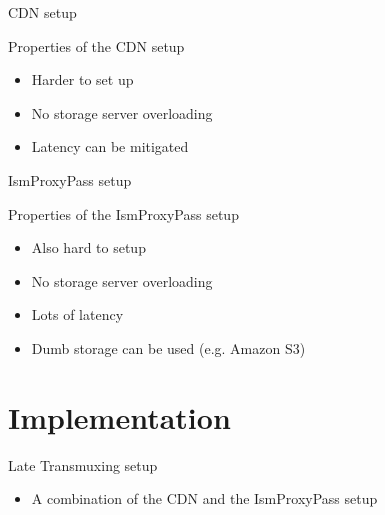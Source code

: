 \documentclass[xcolor=svgnames,handout]{beamer}
\begin{document}
\begin{frame}{CDN setup}
    \begin{figure}

        \resizebox{\textwidth}{!}{%
            
        }
    \end{figure}
\end{frame}

\begin{frame}{Properties of the CDN setup}
  \begin{itemize}
  \item Harder to set up
  \item No storage server overloading
  \item Latency can be mitigated
  \end{itemize}
\end{frame}

\begin{frame}{IsmProxyPass setup}
    \begin{figure}

        \resizebox{\textwidth}{!}{%
            
        }
    \end{figure}
\end{frame}

\begin{frame}{Properties of the IsmProxyPass setup}
  \begin{itemize}
  \item Also hard to setup
  \item No storage server overloading
  \item Lots of latency
  \item Dumb storage can be used (e.g. Amazon S3)
  \end{itemize}
\end{frame}


\section{Implementation}

\begin{frame}{Late Transmuxing setup}
\end{frame}

\begin{frame}
    \begin{itemize}
        \item A combination of the CDN and the IsmProxyPass setup
    \end{itemize}
\end{frame}
\end{document}
